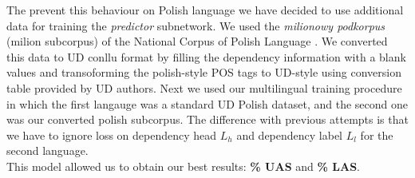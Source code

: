 The prevent this behaviour on Polish language we have decided to use additional data
for training the \emph{predictor} subnetwork. We used the \emph{milionowy podkorpus} (milion subcorpus)
of the National Corpus of Polish Language \cite{przepiorkowski_nkjp_2012}. We converted
this data to UD conllu format by filling the dependency information with a blank values
and transoforming the polish-style POS tags to UD-style using conversion table provided
by UD authors.
Next we used our multilingual training procedure in which the first langauge was
a standard UD Polish dataset, and the second one was our converted polish subcorpus.
The difference with previous attempts is that we have to ignore loss on dependency head
$L_h$ and dependency label $L_l$ for the second language.\\
This model allowed us to obtain our best results: \textbf{\% UAS} and \textbf{\% LAS}.
